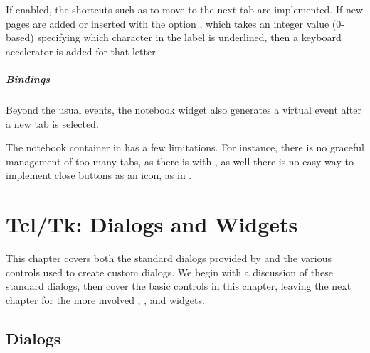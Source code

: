 If enabled, the shortcuts such as  to move to the
next tab are implemented. If new pages are added or inserted with the
option , which takes an integer value
(0-based) specifying which character in the label is underlined, then
a keyboard accelerator is added for that letter.

\paragraph{Bindings}
Beyond the usual events, the notebook widget also generates a
 virtual event after a new tab is
selected.

The notebook container in \TK\/ has a few limitations. For instance,
there is no graceful management of too many tabs, as there is with
\GTK, as well there is no easy way to implement close buttons as an
icon, as in \Qt.


\chapter{Tcl/Tk: Dialogs and Widgets}
\label{sec:tcltk:widgets}

This chapter covers both the standard dialogs provided by \TK\/ and
the various controls used to create custom dialogs. We begin with a
discussion of these standard dialogs, then cover the basic controls
in this chapter, leaving the next chapter for the more involved ,
, and  widgets.




\section{Dialogs}
\label{sec:tcltk:dialogs}
